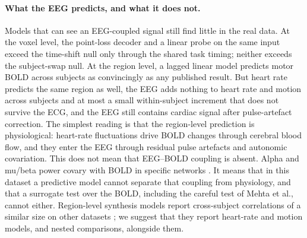 \paragraph{What the EEG predicts, and what it does not.} Models that can see an EEG-coupled signal still find little in the real data. At the voxel level, the point-loss decoder and a linear probe on the same input exceed the time-shift null only through the shared task timing; neither exceeds the subject-swap null. At the region level, a lagged linear model predicts motor BOLD across subjects as convincingly as any published result. But heart rate predicts the same region as well, the EEG adds nothing to heart rate and motion across subjects and at most a small within-subject increment that does not survive the ECG, and the EEG still contains cardiac signal after pulse-artefact correction. The simplest reading is that the region-level prediction is physiological: heart-rate fluctuations drive BOLD changes through cerebral blood flow, and they enter the EEG through residual pulse artefacts and autonomic covariation. This does not mean that EEG--BOLD coupling is absent. Alpha and mu/beta power covary with BOLD in specific networks \citep{goldman2002simultaneous,laufs2003eeg}. It means that in this dataset a predictive model cannot separate that coupling from physiology, and that a surrogate test over the BOLD, including the careful test of Mehta et al., cannot either. Region-level synthesis models report cross-subject correlations of a similar size on other datasets \citep{li2024neurobolt}; we suggest that they report heart-rate and motion models, and nested comparisons, alongside them.

